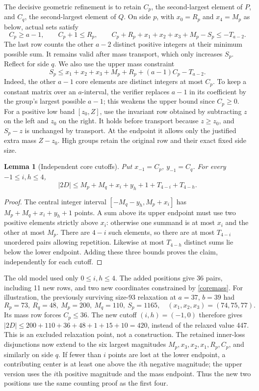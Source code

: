 \documentclass[11pt,a4paper]{article}
\newtheorem{lemma}[theorem]{Lemma}
\begin{document}
The decisive geometric refinement is to retain $C_p$, the second-largest
element of $P$, and $C_q$, the second-largest element of $Q$.
On side $p$, with $x_0=R_p$ and $x_4=M_p$ as below, actual sets satisfy
\begin{equation}\label{coremass}
 C_p\ge a-1,\qquad C_p+1\le R_p,\qquad
 C_p+R_p+x_1+x_2+x_3+M_p-S_p\le-T_{a-2}.
\end{equation}
The last row counts the other $a-2$ distinct positive integers at their
minimum possible sum. It remains valid after mass transport, which only
increases $S_p$. Reflect for side $q$.
We also use the upper mass constraint
\begin{equation}\label{coreupper}
 S_p\le x_1+x_2+x_3+M_p+R_p+(a-1)C_p-T_{a-2}.
\end{equation}
Indeed, the other $a-1$ core elements are distinct integers at most $C_p$.
To keep a constant matrix over an $a$-interval, the verifier replaces
$a-1$ in its coefficient by the group's largest possible $a-1$; this
weakens the upper bound since $C_p\ge0$. For a positive low band
$[z_0,Z]$, use the invariant row obtained by subtracting $z$ on the left
and $z_0$ on the right. It holds before transport because $z\ge z_0$,
and $S_p-z$ is unchanged by transport. At the endpoint it allows only
the justified extra mass $Z-z_0$. High groups retain the original row
and their exact fixed side size.


\begin{lemma}[Independent core cutoffs]\label{cutoff}
Put $x_{-1}=C_p$, $y_{-1}=C_q$. For every $-1\le i,h\le4$,
\begin{equation}\label{tails}
 |2D|\le M_p+M_q+x_i+y_h+1+T_{4-i}+T_{4-h}.
\end{equation}
\end{lemma}
\begin{proof}
The central integer interval $[-M_q-y_h,M_p+x_i]$ has
$M_p+M_q+x_i+y_h+1$ points. A sum above its upper endpoint must use
two positive elements strictly above $x_i$: otherwise one summand is
at most $x_i$ and the other at most $M_p$. There are $4-i$ such elements,
so there are at most $T_{4-i}$ unordered pairs allowing repetition.
Likewise at most $T_{4-h}$ distinct sums lie below the lower endpoint.
Adding these three bounds proves the claim, independently for each cutoff.
\end{proof}
The old model used only $0\le i,h\le4$. The added positions give
36 pairs, including 11 new rows, and two new coordinates constrained
by \eqref{coremass}. For illustration, the previously surviving
size-93 relaxation at $a=37$, $b=39$ had
\[
 R_p=73,\ R_q=48,\ M_p=200,\ M_q=110,\ S_p=1165,
 \quad (x_1,x_2,x_3)=(74,75,77).
\]
Its mass row forces $C_p\le36$. The new cutoff $(i,h)=(-1,0)$ therefore
gives $|2D|\le200+110+36+48+1+15+10=420$, instead of the relaxed value
447. This is an excluded relaxation point, not a construction.
The retained inner-loss disjunctions now extend to the six largest
magnitudes $M_p,x_3,x_2,x_1,R_p,C_p$, and similarly on side $q$.
If fewer than $i$ points are lost at the lower endpoint, a contributing
center is at least one above the $i$th negative magnitude; the upper
version uses the $i$th positive magnitude and the mass endpoint.
Thus the new two positions use the same counting proof as the first four.
\end{document}
